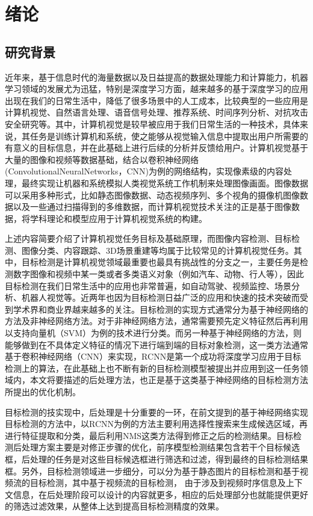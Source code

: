 \documentclass[winfonts,master,twoside,AutoFakeBold= {2}]{njuthesis}
\begin{document}
\mainmatter

\chapter{绪论}\label{chapter_introduction}
\section{研究背景}
近年来，基于信息时代的海量数据以及日益提高的数据处理能力和计算能力，机器学习领域的发展尤为迅猛，特别是深度学习方面，越来越多的基于深度学习的应用出现在我们的日常生活中，降低了很多场景中的人工成本，比较典型的一些应用是计算机视觉、自然语言处理、语音信号处理、推荐系统、时间序列分析、对抗攻击安全研究等。其中，计算机视觉是较早被应用于我们日常生活的一种技术，具体来说，其任务是训练计算机和系统，使之能够从视觉输入信息中提取出用户所需要的有意义的目标信息，并在此基础上进行后续的分析并反馈给用户。计算机视觉基于大量的图像和视频等数据基础，结合以卷积神经网络 (ConvolutionalNeuralNetworks，CNN)为例的网络结构，实现像素级的内容处理，最终实现让机器和系统模拟人类视觉系统工作机制来处理图像画面。图像数据可以采用多种形式，比如静态图像数据、动态视频序列、多个视角的摄像机图像数据以及一些通过扫描得到的多维数据，而计算机视觉技术关注的正是基于图像数据，将学科理论和模型应用于计算机视觉系统的构建。

上述内容简要介绍了计算机视觉任务目标及基础原理，而图像内容检测、目标检测、图像分类、内容跟踪、3D场景重建等均属于比较常见的计算机视觉任务。其中，目标检测是计算机视觉领域最重要也最具有挑战性的分支之一，主要任务是检测数字图像和视频中某一类或者多类语义对象（例如汽车、动物、行人等），因此目标检测在我们日常生活中的应用也非常普遍，如自动驾驶、视频监控、场景分析、机器人视觉等。近两年也因为目标检测日益广泛的应用和快速的技术突破而受到学术界和商业界越来越多的关注。目标检测的实现方式通常分为基于神经网络的方法及非神经网络方法。对于非神经网络方法，通常需要预先定义特征然后再利用以支持向量机（SVM）为例的技术进行分类。而另一种基于神经网络的方法，则能够做到在不具体定义特征的情况下进行端到端的目标对象检测，这一类方法通常基于卷积神经网络（CNN）来实现，RCNN是第一个成功将深度学习应用于目标检测上的算法，在此基础上也不断有新的目标检测模型被提出并应用到这一任务领域内，本文将要描述的后处理方法，也正是基于这类基于神经网络的目标检测方法所提出的优化机制。

目标检测的技实现中，后处理是十分重要的一环，在前文提到的基于神经网络实现目标检测的方法中，以RCNN为例的方法主要利用选择性搜索来生成候选区域，再进行特征提取和分类，最后利用NMS这类方法得到修正之后的检测结果。目标检测后处理方案主要是对修正步骤的优化，前序模型检测结果包含若干个目标候选框，后处理的任务是对这些目标候选框进行筛选和过滤，得到最终的目标检测结果框。另外，目标检测领域进一步细分，可以分为基于静态图片的目标检测和基于视频流的目标检测，其中基于视频流的目标检测， 由于涉及到视频时序信息及上下文信息，在后处理阶段可以设计的内容就更多，相应的后处理部分也就能提供更好的筛选过滤效果，从整体上达到提高目标检测精度的效果。
\end{document}
